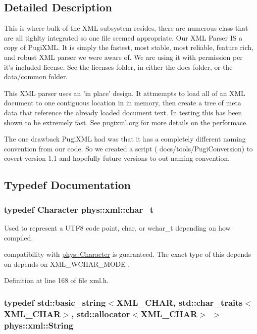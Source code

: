 \subsection{Detailed Description}
This is where bulk of the XML subsystem resides, there are numerous class that are all tighlty integrated so one file seemed appropriate. Our XML Parser IS a copy of PugiXML. It is simply the fastest, most stable, most reliable, feature rich, and robust XML parser we were aware of. We are using it with permission per it's included license. See the licenses folder, in either the docs folder, or the data/common folder. \par
 \par
 This XML parser uses an 'in place' design. It attmempts to load all of an XML document to one contiguous location in in memory, then create a tree of meta data that reference the already loaded document text. In testing this has been shown to be extremely fast. See pugixml.org for more details on the performace. \par
 \par
 The one drawback PugiXML had was that it has a completely different naming convention from our code. So we created a script ( docs/tools/PugiConversion) to covert version 1.1 and hopefully future versions to out naming convention. 

\subsection{Typedef Documentation}
\hypertarget{namespacephys_1_1xml_afc87705cd1c2917d87b879715a2d8f6e}{
\subsubsection[{char\_\-t}]{\setlength{\rightskip}{0pt plus 5cm}typedef {\bf Character} {\bf phys::xml::char\_\-t}}}
\label{d9/d27/namespacephys_1_1xml_afc87705cd1c2917d87b879715a2d8f6e}


Used to represent a UTF8 code point, char, or wchar\_\-t depending on how compiled. 

compatibility with \hyperlink{namespacephys_a3098bae5b0a3cd16eec331f766cc562b}{phys::Character} is guaranteed. The exact type of this depends on depends on XML\_\-WCHAR\_\-MODE . 

Definition at line 168 of file xml.h.

\hypertarget{namespacephys_1_1xml_a4d8ca7638328d16d303e5a4c849f4704}{
\subsubsection[{String}]{\setlength{\rightskip}{0pt plus 5cm}typedef std::basic\_\-string$<$XML\_\-CHAR, std::char\_\-traits$<$XML\_\-CHAR$>$, std::allocator$<$XML\_\-CHAR$>$ $>$ {\bf phys::xml::String}}}
\label{d9/d27/namespacephys_1_1xml_a4d8ca7638328d16d303e5a4c849f4704}


